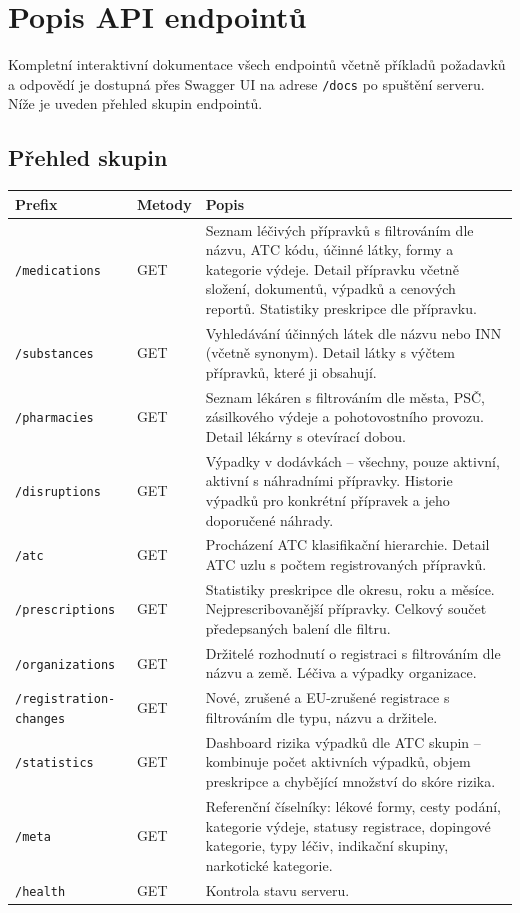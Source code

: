 \documentclass[12pt,a4paper]{article}
\begin{document}
\section{Popis API endpointů}

Kompletní interaktivní dokumentace všech endpointů včetně příkladů požadavků a odpovědí je dostupná přes Swagger UI na adrese \texttt{/docs} po spuštění serveru. Níže je uveden přehled skupin endpointů.

\subsection{Přehled skupin}

\begin{longtable}{@{}llp{7.5cm}@{}}
\toprule
\textbf{Prefix} & \textbf{Metody} & \textbf{Popis} \\
\midrule
\endhead
\texttt{/medications} & GET & Seznam léčivých přípravků s filtrováním dle názvu, ATC kódu, účinné látky, formy a kategorie výdeje. Detail přípravku včetně složení, dokumentů, výpadků a cenových reportů. Statistiky preskripce dle přípravku. \\[0.5em]
\texttt{/substances} & GET & Vyhledávání účinných látek dle názvu nebo INN (včetně synonym). Detail látky s výčtem přípravků, které ji obsahují. \\[0.5em]
\texttt{/pharmacies} & GET & Seznam lékáren s filtrováním dle města, PSČ, zásilkového výdeje a pohotovostního provozu. Detail lékárny s otevírací dobou. \\[0.5em]
\texttt{/disruptions} & GET & Výpadky v dodávkách -- všechny, pouze aktivní, aktivní s náhradními přípravky. Historie výpadků pro konkrétní přípravek a jeho doporučené náhrady. \\[0.5em]
\texttt{/atc} & GET & Procházení ATC klasifikační hierarchie. Detail ATC uzlu s počtem registrovaných přípravků. \\[0.5em]
\texttt{/prescriptions} & GET & Statistiky preskripce dle okresu, roku a měsíce. Nejprescribovanější přípravky. Celkový součet předepsaných balení dle filtru. \\[0.5em]
\texttt{/organizations} & GET & Držitelé rozhodnutí o registraci s filtrováním dle názvu a země. Léčiva a výpadky organizace. \\[0.5em]
\texttt{/registration-changes} & GET & Nové, zrušené a EU-zrušené registrace s filtrováním dle typu, názvu a držitele. \\[0.5em]
\texttt{/statistics} & GET & Dashboard rizika výpadků dle ATC skupin -- kombinuje počet aktivních výpadků, objem preskripce a chybějící množství do skóre rizika. \\[0.5em]
\texttt{/meta} & GET & Referenční číselníky: lékové formy, cesty podání, kategorie výdeje, statusy registrace, dopingové kategorie, typy léčiv, indikační skupiny, narkotické kategorie. \\[0.5em]
\texttt{/health} & GET & Kontrola stavu serveru. \\
\bottomrule
\end{longtable}
\end{document}
